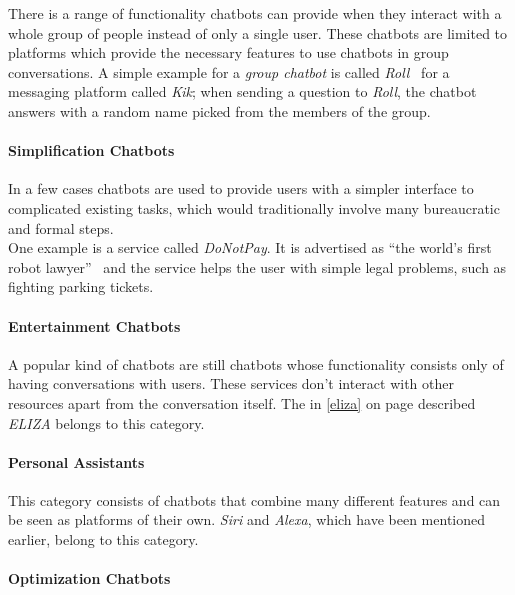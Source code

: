 There is a range of functionality chatbots can provide when they interact with a whole group of people instead of only a single user.
These chatbots are limited to platforms which provide the necessary features to use chatbots in group conversations.
A simple example for a \emph{group chatbot} is called \emph{Roll}~\cite{venturebeat} for a messaging platform called \emph{Kik};
when sending a question to \emph{Roll}, the chatbot answers with a random name picked from the members of the group.


\paragraph{Simplification Chatbots}

In a few cases chatbots are used to provide users with a simpler interface to complicated existing tasks, which would traditionally involve many bureaucratic and formal steps.
\\
One example is a service called \emph{DoNotPay}.
It is advertised as ``the world's first robot lawyer''~\cite{oreilly} and the service helps the user with simple legal problems,
such as fighting parking tickets.


\paragraph{Entertainment Chatbots}

A popular kind of chatbots are still chatbots whose functionality consists only of having conversations with users.
These services don't interact with other resources apart from the conversation itself.
The in \ref{eliza} on page \pageref{eliza} described \emph{ELIZA} belongs to this category.


\paragraph{Personal Assistants}
\label{assistants}

This category consists of chatbots that combine many different features and can be seen as platforms of their own.
\emph{Siri} and \emph{Alexa}, which have been mentioned earlier, belong to this category.


\paragraph{Optimization Chatbots}

